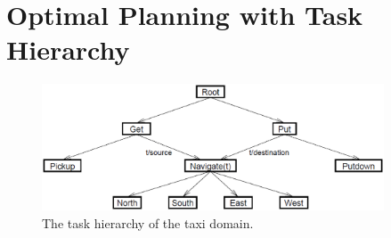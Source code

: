 
\section{Optimal Planning with Task Hierarchy}
\label{se:OptimalPlanning}
\begin{figure}[t]
\begin{center}
    \includegraphics[width=4in] {./figures/TaxiHierarchy.eps}
\end{center}
\caption{The task hierarchy of the taxi domain.}
\label{fig:taxi}
\end{figure}

